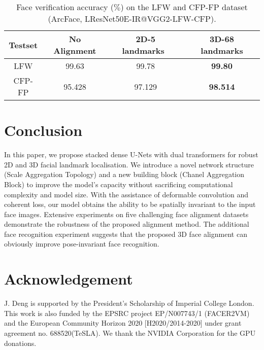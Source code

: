 \documentclass{bmvc2k}
\begin{document}
\begin{table}[h!]
\begin{center}
\begin{tabular}{c|c|c|c}
\hline
Testset       & No Alignment   & 2D-5 landmarks~\cite{zhang2016joint} & 3D-68 landmarks\\
\hline
LFW   &  99.63 & 99.78  & {\bf 99.80} \\
CFP-FP &  95.428 & 97.129 & {\bf 98.514} \\
\hline
\end{tabular}
\end{center}
\vspace{-2mm}
\caption{Face verification accuracy ($\%$) on the LFW and CFP-FP dataset (ArcFace, LResNet50E-IR@VGG2-LFW-CFP).}
\vspace{-6mm}
\label{table:facerecognition}
\end{table}

\section{Conclusion}

In this paper, we propose stacked dense U-Nets with dual transformers for robust 2D and 3D facial landmark localisation.
We introduce a novel network structure (Scale Aggregation Topology) and a new building block (Chanel Aggregation Block) to improve the model's capacity without sacrificing computational complexity and model size. With the assistance of deformable convolution and coherent loss, our model obtains the ability to be spatially invariant to the input face images. Extensive experiments on five challenging face alignment datasets demonstrate the robustness of the proposed alignment method. The additional face recognition experiment suggests that the proposed 3D face alignment can obviously improve pose-invariant face recognition.



\section{Acknowledgement}

J. Deng is supported by the President's Scholarship of Imperial College London. This work is also funded by the EPSRC project EP/N007743/1 (FACER2VM) and the European Community Horizon 2020 [H2020/2014-2020] under grant agreement no. 688520(TeSLA). We thank the NVIDIA Corporation for the GPU donations.


\end{document}
